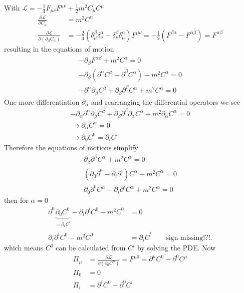 \documentclass[10pt,a4paper]{book}
\theoremstyle{definition}
\begin{document}
With $\mathcal{L}=-\frac{1}{4}F_{\mu\nu}F^{\mu\nu}+\frac{1}{2}m^2C_\mu C^\mu$
\begin{align}
\frac{\partial\mathcal{L}}{\partial C_\alpha}&=m^2C^\alpha\\
\frac{\partial\mathcal{L}}{\partial(\partial_\beta C_\alpha)}&=-\frac{2}{4}(\delta^\beta_\mu\delta^\alpha_\nu-\delta^\beta_\nu\delta^\alpha_\mu)F^{\mu\nu}=-\frac{1}{2}(F^{\beta\alpha}-F^{\alpha\beta})=F^{\alpha\beta}
\end{align}
resulting in the equations of motion
\begin{align}
-\partial_\beta F^{\alpha\beta}+m^2C^\alpha=0\\
-\partial_\beta (\partial^\alpha C^\beta-\partial^\beta C^\alpha)+m^2C^\alpha=0\\
-\partial^\alpha \partial_\beta C^\beta+\partial_\beta\partial^\beta C^\alpha+m^2C^\alpha=0
\end{align}
One more differentiation $\partial_\alpha$ and rearranging the differential operators we see
\begin{align}
-\partial_\alpha\partial^\alpha\partial_\beta C^\beta+\partial_\beta\partial^\beta \partial_\alpha C^\alpha+m^2\partial_\alpha C^\alpha=0\\
\rightarrow\partial_\alpha C^\alpha=0\\
\rightarrow\partial_0C^0=\partial_iC^i
\end{align}
Therefore the equations of motions simplify
\begin{align}
\partial_\beta\partial^\beta C^\alpha+m^2C^\alpha=0\\
(\partial_0\partial^0-\partial_i\partial^i) C^\alpha+m^2C^\alpha=0\\
\partial_0\partial^0C^\alpha-\partial_i\partial^i C^\alpha+m^2C^\alpha=0
\end{align}
then for $\alpha=0$
\begin{align}
\partial^0\underbrace{\partial_0C^0}_{=\partial_iC^i}-\partial_i\partial^i C^0+m^2C^0&=0\\
\partial_i\partial^i C^0-m^2C^0&=\partial_i\dot{C}^i\qquad\text{sign missing!?!}.
\end{align}
which means $C^0$ can be calculated from $C^i$ by solving the PDE. Now
\begin{align}
\Pi_\mu
&=\frac{\partial\mathcal{L}}{\partial(\partial_0C^\mu)}=F^{\mu0}=\partial^\mu C^0-\partial^0C^\mu\\
\Pi_0&=0\\
\Pi_i&=\partial^iC^0-\partial^0C^i
\end{align}
\end{document}
